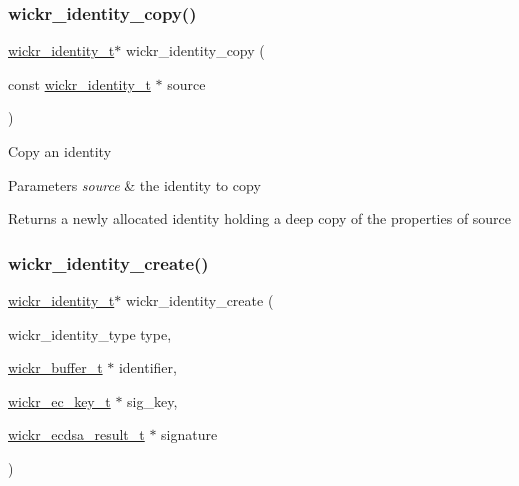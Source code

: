 \subsubsection{\texorpdfstring{wickr\+\_\+identity\+\_\+copy()}{wickr\_identity\_copy()}}
{\footnotesize\ttfamily \hyperlink{structwickr__identity}{wickr\+\_\+identity\+\_\+t}$\ast$ wickr\+\_\+identity\+\_\+copy (\begin{DoxyParamCaption}\item[{const \hyperlink{structwickr__identity}{wickr\+\_\+identity\+\_\+t} $\ast$}]{source }\end{DoxyParamCaption})}

Copy an identity


\begin{DoxyParams}{Parameters}
{\em source} & the identity to copy \\
\hline
\end{DoxyParams}
\begin{DoxyReturn}{Returns}
a newly allocated identity holding a deep copy of the properties of \textquotesingle{}source\textquotesingle{} 
\end{DoxyReturn}
\mbox{\label{group__wickr__identity_ga75bfef275a250a32784231e8c042913b}} 
\subsubsection{\texorpdfstring{wickr\+\_\+identity\+\_\+create()}{wickr\_identity\_create()}}
{\footnotesize\ttfamily \hyperlink{structwickr__identity}{wickr\+\_\+identity\+\_\+t}$\ast$ wickr\+\_\+identity\+\_\+create (\begin{DoxyParamCaption}\item[{wickr\+\_\+identity\+\_\+type}]{type,  }\item[{\hyperlink{structwickr__buffer}{wickr\+\_\+buffer\+\_\+t} $\ast$}]{identifier,  }\item[{\hyperlink{structwickr__ec__key}{wickr\+\_\+ec\+\_\+key\+\_\+t} $\ast$}]{sig\+\_\+key,  }\item[{\hyperlink{structwickr__ecdsa__result}{wickr\+\_\+ecdsa\+\_\+result\+\_\+t} $\ast$}]{signature }\end{DoxyParamCaption})}

